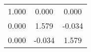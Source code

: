 \begin{table}[ht]
	\begin{center}
	\label{tab:bmatrix}
		\begin{tabular}{ccc}
		\toprule
			1.000 & 0.000 & 0.000\\
			0.000 & 1.579 & -0.034\\
			0.000 & -0.034 & 1.579\\
		\bottomrule
		\end{tabular}
	\end{center}
\end{table}